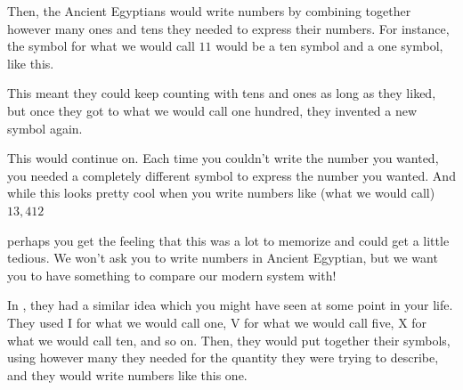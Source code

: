 \documentclass{ximera}
\begin{document}
\begin{image}
\end{image}


Then, the Ancient Egyptians would write numbers by combining together however many ones and tens they needed to express their numbers. For instance, the symbol for what we would call $11$ would be a ten symbol and a one symbol, like this.

\begin{image}
\end{image}

 This meant they could keep counting with tens and ones as long as they liked, but once they got to what we would call one hundred, they invented a new symbol again.

\begin{image}
\end{image}

This would continue on. Each time you couldn't write the number you wanted, you needed a completely different symbol to express the number you wanted. And while this looks pretty cool when you write numbers like (what we would call) $13,412$

\begin{image}
\end{image}

perhaps you get the feeling that this was a lot to memorize and could get a little tedious. We won't ask you to write numbers in Ancient Egyptian, but we want you to have something to compare our modern system with!

In , they had a similar idea which you might have seen at some point in your life. They used I for what we would call one, V for what we would call five, X for what we would call ten, and so on. Then, they would put together their symbols, using however many they needed for the quantity they were trying to describe, and they would write numbers like this one. 
\end{document}
